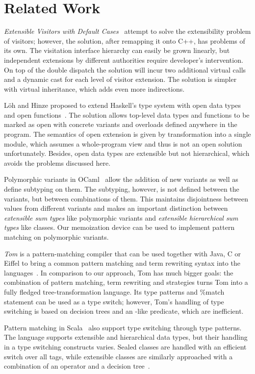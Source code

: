 \section{Related Work} %
\label{sec:rw}

\emph{Extensible Visitors with Default Cases}~\cite[]{Zenger:2001} attempt to solve the extensibility problem of visitors; 
however, the solution, after 
remapping it onto C++, has problems of its own. The visitation interface 
hierarchy can easily be grown linearly, but independent extensions by different  
authorities require developer's intervention. On top of the double dispatch the 
solution will incur two additional virtual calls and a dynamic cast for each 
level of visitor extension. The solution is simpler with virtual inheritance, 
which adds even more indirections.

L\"{o}h and Hinze proposed to extend Haskell's type system with open data types 
and open functions~\cite{LohHinze2006}. The solution allows top-level data types 
and functions to be marked as open with concrete variants and overloads defined 
anywhere in the program. The semantics of open extension is given by 
transformation into a single module, which assumes a whole-program view and thus 
is not an open solution unfortunately. Besides, open data types are extensible but not 
hierarchical, which avoids the problems discussed here.

Polymorphic variants in OCaml~\cite{garrigue-98} allow the addition of new 
variants as well as define subtyping on them. The subtyping, however, is not 
defined between the variants, but between combinations of them. 
This maintains disjointness between values from different variants and makes an 
important distinction between \emph{extensible sum types} like polymorphic 
variants and \emph{extensible hierarchical sum types} like classes. Our 
memoization device can be used to implement pattern matching on polymorphic 
variants.

\emph{Tom} is a pattern-matching compiler that can be used together with Java, C or 
Eiffel to bring a common pattern matching and term rewriting syntax into the 
languages~\cite{Moreau:2003}. In comparison to our approach, Tom has much bigger 
goals: the combination of pattern matching, term rewriting and strategies turns 
Tom into a fully fledged tree-transformation language. Its type patterns and \%match 
statement can be used as a type switch; however, Tom's handling of type 
switching is based on decision trees and an -like predicate, 
which are inefficient.

Pattern matching in Scala~\cite{Scala2nd} also support type switching through 
type patterns. The language supports extensible and hierarchical data types, but
their handling in a type switching constructs varies. Sealed classes are handled 
with an efficient switch over all tags, while extensible classes are similarly 
approached with a combination of an  operator and a decision 
tree~\cite{EmirThesis}.
